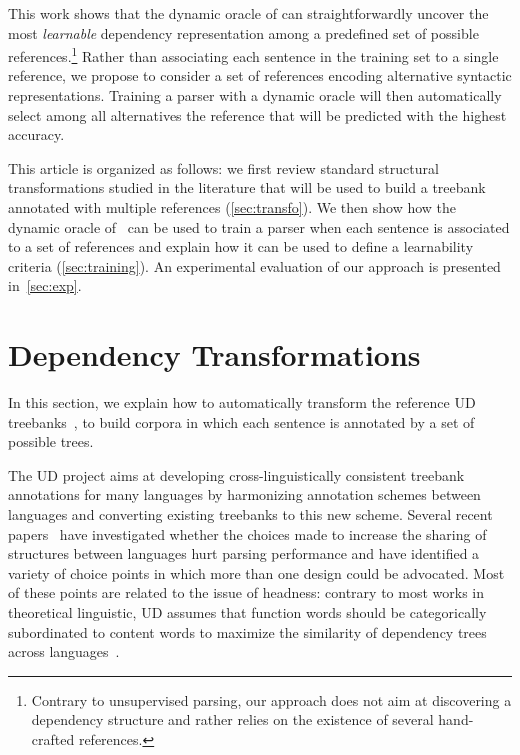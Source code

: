 \documentclass[11pt,letterpaper]{article}
\begin{document}
This work shows that the dynamic oracle of
 can straightforwardly uncover the most
\emph{learnable} dependency representation among a predefined set of
possible references.\footnote{Contrary to unsupervised parsing, our
  approach does not aim at discovering a dependency structure and
  rather relies on the existence of several hand-crafted references.}
Rather than associating each sentence in the training set to a single
reference, we propose to consider a set of references encoding
alternative syntactic representations. Training a parser with a
dynamic oracle will then automatically select among all alternatives
the reference that will be predicted with the highest accuracy.

This article is organized as follows: we first review standard
structural transformations studied in the literature that will be used
to build a treebank annotated with multiple references
(\textsection\ref{sec:transfo}). We then show how the dynamic oracle
of~ can be used to train a parser when
each sentence is associated to a set of references and explain how
it can be used to define a learnability criteria
(\textsection\ref{sec:training}). An experimental evaluation of our
approach is presented in~\textsection\ref{sec:exp}.

\section{Dependency Transformations \label{sec:transfo}}

In this section, we explain how to automatically transform the
reference UD treebanks~\cite{nivre16universal}, to build corpora
in which each sentence is annotated by a set of possible trees.

The UD project aims at developing cross-linguistically consistent
treebank annotations for many languages by harmonizing annotation
schemes between languages and converting existing treebanks to this
new scheme. Several recent
papers~\cite{kohita17multilingual,delhoneux2016representation,silveira15does,popel13coordination}
have investigated whether the choices made to increase the sharing of
structures between languages hurt parsing performance and have
identified a variety of choice points in which more than one design
could be advocated. Most of these points are related to the issue of
headness: contrary to most works in theoretical linguistic, UD assumes
that function words should be categorically subordinated to content
words to maximize the similarity of dependency trees across
languages~\cite{osborne15historical}.
\end{document}

